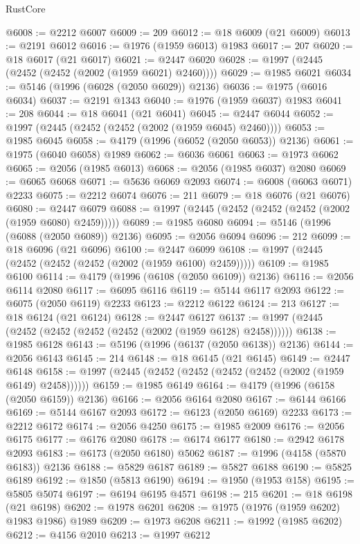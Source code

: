 \begin{lexlean}{RustCore}
\begin{coremodule}
@6008 := @2212 @6007
@6009 := 209
@6012 := @18 @6009 (@21 @6009)
@6013 := @2191 @6012
@6016 := @1976 (@1959 @6013) @1983
@6017 := 207
@6020 := @18 @6017 (@21 @6017)
@6021 := @2447 @6020
@6028 := @1997 (@2445 (@2452 (@2452 (@2002 (@1959 @6021) @2460))))
@6029 := @1985 @6021
@6034 := @5146 (@1996 (@6028 (@2050 @6029)) @2136)
@6036 := @1975 (@6016 @6034)
@6037 := @2191 @1343
@6040 := @1976 (@1959 @6037) @1983
@6041 := 208
@6044 := @18 @6041 (@21 @6041)
@6045 := @2447 @6044
@6052 := @1997 (@2445 (@2452 (@2452 (@2002 (@1959 @6045) @2460))))
@6053 := @1985 @6045
@6058 := @4179 (@1996 (@6052 (@2050 @6053)) @2136)
@6061 := @1975 (@6040 @6058) @1989
@6062 := @6036 @6061
@6063 := @1973 @6062
@6065 := @2056 (@1985 @6013)
@6068 := @2056 (@1985 @6037) @2080
@6069 := @6065 @6068
@6071 := @5636 @6069 @2093
@6074 := @6008 (@6063 @6071) @2233
@6075 := @2212 @6074
@6076 := 211
@6079 := @18 @6076 (@21 @6076)
@6080 := @2447 @6079
@6088 := @1997 (@2445 (@2452 (@2452 (@2452 (@2002 (@1959 @6080) @2459)))))
@6089 := @1985 @6080
@6094 := @5146 (@1996 (@6088 (@2050 @6089)) @2136)
@6095 := @2056 @6094
@6096 := 212
@6099 := @18 @6096 (@21 @6096)
@6100 := @2447 @6099
@6108 := @1997 (@2445 (@2452 (@2452 (@2452 (@2002 (@1959 @6100) @2459)))))
@6109 := @1985 @6100
@6114 := @4179 (@1996 (@6108 (@2050 @6109)) @2136)
@6116 := @2056 @6114 @2080
@6117 := @6095 @6116
@6119 := @5144 @6117 @2093
@6122 := @6075 (@2050 @6119) @2233
@6123 := @2212 @6122
@6124 := 213
@6127 := @18 @6124 (@21 @6124)
@6128 := @2447 @6127
@6137 := @1997 (@2445 (@2452 (@2452 (@2452 (@2452 (@2002 (@1959 @6128) @2458))))))
@6138 := @1985 @6128
@6143 := @5196 (@1996 (@6137 (@2050 @6138)) @2136)
@6144 := @2056 @6143
@6145 := 214
@6148 := @18 @6145 (@21 @6145)
@6149 := @2447 @6148
@6158 := @1997 (@2445 (@2452 (@2452 (@2452 (@2452 (@2002 (@1959 @6149) @2458))))))
@6159 := @1985 @6149
@6164 := @4179 (@1996 (@6158 (@2050 @6159)) @2136)
@6166 := @2056 @6164 @2080
@6167 := @6144 @6166
@6169 := @5144 @6167 @2093
@6172 := @6123 (@2050 @6169) @2233
@6173 := @2212 @6172
@6174 := @2056 @4250
@6175 := @1985 @2009
@6176 := @2056 @6175
@6177 := @6176 @2080
@6178 := @6174 @6177
@6180 := @2942 @6178 @2093
@6183 := @6173 (@2050 @6180) @5062
@6187 := @1996 (@4158 (@5870 @6183)) @2136
@6188 := @5829 @6187
@6189 := @5827 @6188
@6190 := @5825 @6189
@6192 := @1850 (@5813 @6190)
@6194 := @1950 (@1953 @158)
@6195 := @5805 @5074
@6197 := @6194 @6195 @4571
@6198 := 215
@6201 := @18 @6198 (@21 @6198)
@6202 := @1978 @6201
@6208 := @1975 (@1976 (@1959 @6202) @1983 @1986) @1989
@6209 := @1973 @6208
@6211 := @1992 (@1985 @6202)
@6212 := @4156 @2010
@6213 := @1997 @6212

\end{coremodule}
\end{lexlean}
